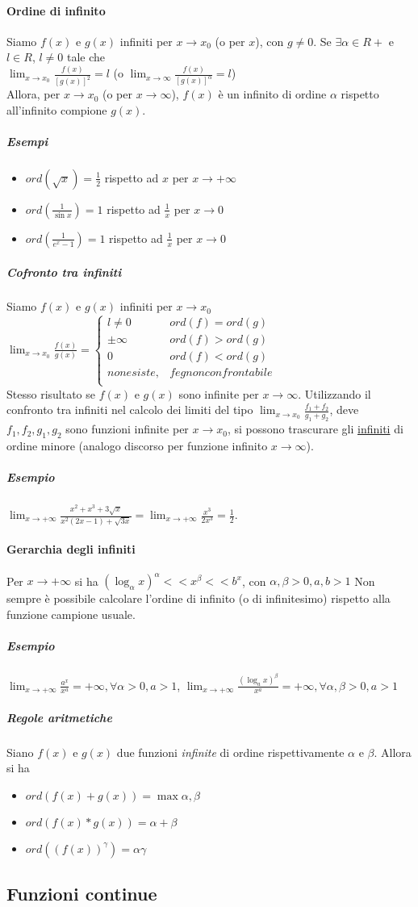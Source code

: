 \documentclass{book}
\begin{document}
\paragraph{Ordine di infinito}
Siamo $f(x)$ e $g(x)$ infiniti per $x\to x_0$ (o per $x$), con $g\neq 0$. Se $\exists\alpha\in R+$ e $l\in R$, $l\neq 0$ tale che\\
$\lim_{x\to x_0}\frac{f(x)}{[g(x)]^2}=l$ (o $\lim_{x\to \infty}\frac{f(x)}{[g(x)]^\alpha}=l$)\\
Allora, per $x\to x_0$ (o per $x\to \infty$), $f(x)$ è un infinito di ordine $\alpha$ rispetto all'infinito compione $g(x)$.
\subparagraph{Esempi}
\begin{itemize}
	\item $ord(\sqrt{x})=\frac{1}{2}$ rispetto ad $x$ per $x\to +\infty$
	\item $ord(\frac{1}{\sin x})=1$ rispetto ad $\frac{1}{x}$ per $x\to 0$
	\item $ord(\frac{1}{e^x-1})=1$ rispetto ad $\frac{1}{x}$ per $x\to 0$
\end{itemize}
\subparagraph{Cofronto tra infiniti}
Siamo $f(x)$ e $g(x)$ infiniti per $x\to x_0$\\
$\lim_{x\to x_0}\frac{f(x)}{g(x)}=\begin{cases}
l\neq 0&ord(f)=ord(g)\\
\pm \infty&ord(f)>ord(g)\\
0&ord(f)<ord(g)\\
non esiste, & f e g non confrontabile \\ 
\end{cases}
$\\
Stesso risultato se $f(x)$ e $g(x)$ sono infinite per $x \to \infty$. Utilizzando il confronto tra infiniti nel calcolo dei limiti del tipo $\lim_{x\to x_0}\frac{f_1+f_2}{g_1+g_2}$, deve $f_1,f_2,g_1,g_2$ sono funzioni infinite per $x\to x_0$, si possono {\color{red}trascurare gli \underline{infiniti} di ordine minore} (analogo discorso per funzione infinito $x\to \infty$).
\subparagraph{Esempio}
$\lim_{x\to +\infty}\frac{x^2+x^3+3\sqrt{x}}{x^2(2x-1)+\sqrt{3x}}=\lim_{x\to +\infty}\frac{x^3}{2x^3}=\frac{1}{2}$.
\paragraph{Gerarchia degli infiniti}
Per $x\to +\infty$ si ha $(\log_\alpha x)^\alpha<<x^\beta<<b^x$, con $\alpha,\beta>0,a,b>1$ Non sempre è possibile calcolare l'ordine di infinito (o di infinitesimo) rispetto alla funzione campione usuale.\\
\subparagraph{Esempio}
$\lim_{x\to +\infty}\frac{a^x}{x^a}=+\infty, \forall \alpha>0, a>1$, $\lim_{x\to +\infty}\frac{(\log_a x)^\beta}{x^a}=+\infty, \forall \alpha, \beta>0, a>1$
\subparagraph{Regole aritmetiche}
Siano $f(x)$ e $g(x)$ due funzioni \emph{infinite} di ordine rispettivamente $\alpha$ e $\beta$. Allora si ha
\begin{itemize}
	\item $ord(f(x)+g(x))=\max{\alpha,\beta}$
	\item $ord(f(x)*g(x))=\alpha+\beta$
	\item $ord((f(x))^\gamma)=\alpha\gamma$
\end{itemize}
\subsection{Funzioni continue}

\printindex
\end{document}
